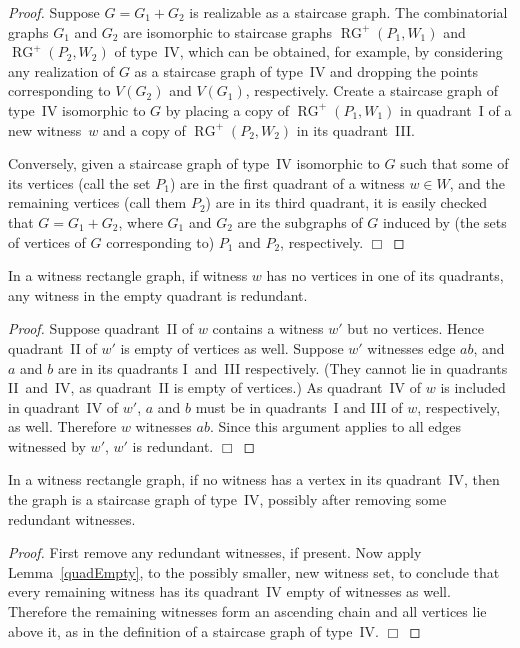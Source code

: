 \documentclass{llncs}
\DeclareMathOperator{\RG}{RG} \DeclareMathOperator{\RIG}{RIG} \DeclareMathOperator{\MNG}{MNG} \DeclareMathOperator{\GG}{GG} \DeclareMathOperator{\DG}{DG} \DeclareMathOperator{\WRG}{WRG}
\begin{document}
\begin{proof}
Suppose $G=G_1+G_2$ is realizable as a staircase graph. 
  The combinatorial graphs $G_1$ and $G_2$ are
  isomorphic to staircase graphs $\RG^+(P_1,W_1)$ and $\RG^+(P_2,W_2)$
  of type~IV, which can be obtained, for example, by considering any
  realization of $G$ as a staircase graph of type~IV and dropping the
  points corresponding to $V(G_2)$ and $V(G_1)$, respectively.  Create
  a staircase graph of type~IV isomorphic to $G$ by placing a copy of
  $\RG^+(P_1,W_1)$ in quadrant~I of a new witness~$w$ and a copy of
  $\RG^+(P_2,W_2)$ in its quadrant~III.

  Conversely, given a staircase graph of type~IV isomorphic to $G$ such that some
  of its vertices (call the set $P_1$) are in the first quadrant of a
  witness $w \in W$, and the remaining vertices (call them $P_2$) are
  in its third quadrant, it is easily checked that $G=G_1+G_2$, where
  $G_1$ and $G_2$ are the subgraphs of $G$ induced by (the sets of
  vertices of $G$ corresponding to) $P_1$ and $P_2$, respectively.  \hfill $\Box$
\end{proof}

\begin{lemma}
  \label{quadEmpty}
  In a witness rectangle graph, if witness $w$ has no vertices in one of its quadrants,
  any witness in the empty quadrant is redundant.
\end{lemma}
\begin{proof}
  Suppose quadrant~II of $w$ contains a witness $w'$ but no vertices.
  Hence quadrant~II of $w'$ is empty of vertices as well.  Suppose
  $w'$ witnesses edge $ab$, and $a$ and $b$ are in its quadrants
  I~and~III respectively. (They cannot lie in quadrants II~and~IV, as
  quadrant~II is empty of vertices.)  As quadrant~IV of $w$ is
  included in quadrant~IV of $w'$, $a$ and $b$ must be in quadrants~I
  and III of $w$, respectively, as well.  Therefore $w$ witnesses
  $ab$.  Since this argument applies to all edges witnessed by $w'$,
  $w'$ is redundant.  \hfill $\Box$
\end{proof}

\begin{lemma}
  \label{quadEmpty2}
In a witness rectangle graph, if no witness has a vertex in its quadrant~IV, then the
  graph is a staircase graph of type~IV, possibly after removing some
  redundant witnesses.
\end{lemma}
\begin{proof}
  First remove any redundant witnesses, if present.  Now apply
  Lemma~\ref{quadEmpty}, to the possibly smaller, new witness set, to
  conclude that every remaining witness has its quadrant~IV empty of
  witnesses as well.  Therefore the remaining witnesses form an
  ascending chain and all vertices lie above it, as in the definition
  of a staircase graph of type~IV.  \hfill $\Box$
\end{proof}
\end{document}
